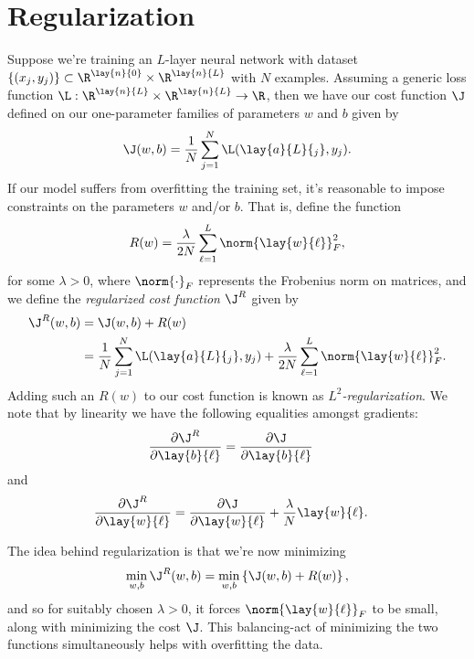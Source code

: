 

\section{Regularization}

Suppose we're training an $L$-layer neural network with dataset $\{(x_j,y_j)\}\subset\R^{\lay{n}{0}}\times\R^{\lay{n}{L}}$ with $N$ examples.  Assuming a generic loss function $\L:\R^{\lay{n}{L}}\times\R^{\lay{n}{L}}\to\R$, then we have our cost function $\J$ defined on our one-parameter families of parameters $w$ and $b$ given by
$$\J(w,b)=\frac{1}{N}\sum_{j=1}^N\L(\lay{a}{L}{_j},y_j).$$
If our model suffers from overfitting the training set, it's reasonable to impose constraints on the parameters $w$ and/or $b$.  That is, define the function
$$R(w)=\frac{\lambda}{2N}\sum_{\ell=1}^L\norm{\lay{w}{\ell}}_F^2,$$
for some $\lambda>0$, where $\norm{\cdot}_F$ represents the Frobenius norm on matrices, and we define the \textit{regularized cost function} $\J^R$ given by
\begin{align*}
	\J^R(w,b)&=\J(w,b)+R(w)\\
	&=\frac{1}{N}\sum_{j=1}^N\L(\lay{a}{L}{_j},y_j)+\frac{\lambda}{2N}\sum_{\ell=1}^L\norm{\lay{w}{\ell}}_F^2.
\end{align*}
Adding such an $R(w)$ to our cost function is known as \textit{$L^2$-regularization}.  We note that by linearity we have the following equalities amongst gradients:
\begin{align*}
	\frac{\partial\J^R}{\partial\lay{b}{\ell}}&=\frac{\partial\J}{\partial\lay{b}{\ell}}
\end{align*}
and
\begin{align*}
	\frac{\partial\J^R}{\partial\lay{w}{\ell}}&=\frac{\partial\J}{\partial\lay{w}{\ell}}+\frac{\lambda}{N}\lay{w}{\ell}.
\end{align*}

The idea behind regularization is that we're now minimizing
$$\min_{w,b}\J^R(w,b)=\min_{w,b}\left\{\J(w,b)+R(w)\right\},$$
and so for suitably chosen $\lambda>0$, it forces $\norm{\lay{w}{\ell}}_F$ to be small, along with minimizing the cost $\J$.  This balancing-act of minimizing the two functions simultaneously helps with overfitting the data.

